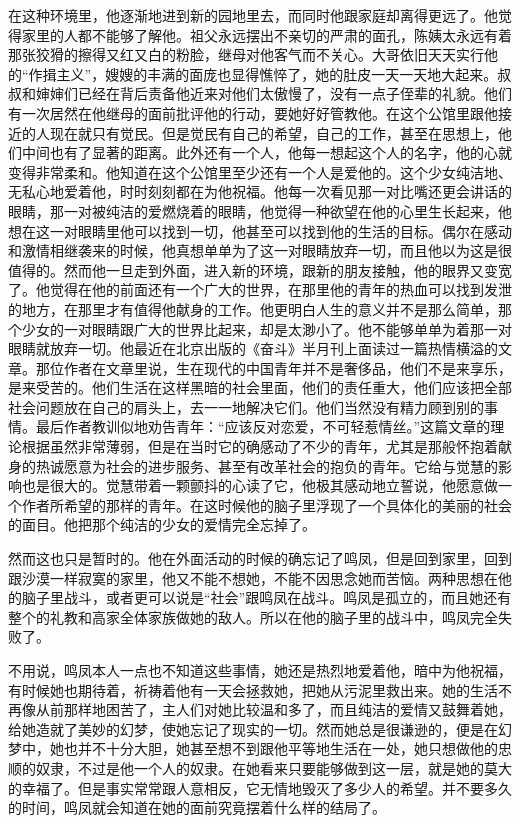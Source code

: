 \par 在这种环境里，他逐渐地进到新的园地里去，而同时他跟家庭却离得更远了。他觉得家里的人都不能够了解他。祖父永远摆出不亲切的严肃的面孔，陈姨太永远有着那张狡猾的擦得又红又白的粉脸，继母对他客气而不关心。大哥依旧天天实行他的“作揖主义”，嫂嫂的丰满的面庞也显得憔悴了，她的肚皮一天一天地大起来。叔叔和婶婶们已经在背后责备他近来对他们太傲慢了，没有一点子侄辈的礼貌。他们有一次居然在他继母的面前批评他的行动，要她好好管教他。在这个公馆里跟他接近的人现在就只有觉民。但是觉民有自己的希望，自己的工作，甚至在思想上，他们中间也有了显著的距离。此外还有一个人，他每一想起这个人的名字，他的心就变得非常柔和。他知道在这个公馆里至少还有一个人是爱他的。这个少女纯洁地、无私心地爱着他，时时刻刻都在为他祝福。他每一次看见那一对比嘴还更会讲话的眼睛，那一对被纯洁的爱燃烧着的眼睛，他觉得一种欲望在他的心里生长起来，他想在这一对眼睛里他可以找到一切，他甚至可以找到他的生活的目标。偶尔在感动和激情相继袭来的时候，他真想单单为了这一对眼睛放弃一切，而且他以为这是很值得的。然而他一旦走到外面，进入新的环境，跟新的朋友接触，他的眼界又变宽了。他觉得在他的前面还有一个广大的世界，在那里他的青年的热血可以找到发泄的地方，在那里才有值得他献身的工作。他更明白人生的意义并不是那么简单，那个少女的一对眼睛跟广大的世界比起来，却是太渺小了。他不能够单单为着那一对眼睛就放弃一切。他最近在北京出版的《奋斗》半月刊上面读过一篇热情横溢的文章。那位作者在文章里说，生在现代的中国青年并不是奢侈品，他们不是来享乐，是来受苦的。他们生活在这样黑暗的社会里面，他们的责任重大，他们应该把全部社会问题放在自己的肩头上，去一一地解决它们。他们当然没有精力顾到别的事情。最后作者教训似地劝告青年：“应该反对恋爱，不可轻惹情丝。”这篇文章的理论根据虽然非常薄弱，但是在当时它的确感动了不少的青年，尤其是那般怀抱着献身的热诚愿意为社会的进步服务、甚至有改革社会的抱负的青年。它给与觉慧的影响也是很大的。觉慧带着一颗颤抖的心读了它，他极其感动地立誓说，他愿意做一个作者所希望的那样的青年。在这时候他的脑子里浮现了一个具体化的美丽的社会的面目。他把那个纯洁的少女的爱情完全忘掉了。
\par 然而这也只是暂时的。他在外面活动的时候的确忘记了鸣凤，但是回到家里，回到跟沙漠一样寂寞的家里，他又不能不想她，不能不因思念她而苦恼。两种思想在他的脑子里战斗，或者更可以说是“社会”跟鸣凤在战斗。鸣凤是孤立的，而且她还有整个的礼教和高家全体家族做她的敌人。所以在他的脑子里的战斗中，鸣凤完全失败了。
\par 不用说，鸣凤本人一点也不知道这些事情，她还是热烈地爱着他，暗中为他祝福，有时候她也期待着，祈祷着他有一天会拯救她，把她从污泥里救出来。她的生活不再像从前那样地困苦了，主人们对她比较温和多了，而且纯洁的爱情又鼓舞着她，给她造就了美妙的幻梦，使她忘记了现实的一切。然而她总是很谦逊的，便是在幻梦中，她也并不十分大胆，她甚至想不到跟他平等地生活在一处，她只想做他的忠顺的奴隶，不过是他一个人的奴隶。在她看来只要能够做到这一层，就是她的莫大的幸福了。但是事实常常跟人意相反，它无情地毁灭了多少人的希望。并不要多久的时间，鸣凤就会知道在她的面前究竟摆着什么样的结局了。

